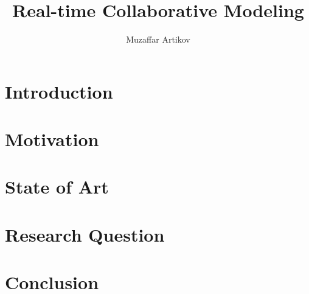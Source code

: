 \documentclass[10pt, oneside]{article}
\title{Real-time Collaborative Modeling}
\author{Muzaffar Artikov}
\date{}
\begin{document}
\maketitle

\section{Introduction}

\section{Motivation}

\section{State of Art}

\section{Research Question}

\section{Conclusion}




\end{document}
